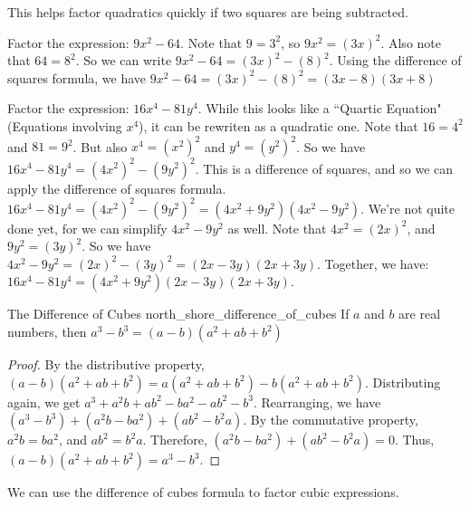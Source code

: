 \documentclass[crop=false,class=article,oneside]{standalone}
\begin{document}
        \begin{remark}
            This helps factor quadratics quickly if two
            squares are being subtracted.
        \end{remark}
        \begin{frameexample}{}{}
            Factor the expression: $9x^{2}-64$.
            Note that $9=3^{2}$, so $9x^{2}=(3x)^{2}$.
            Also note that $64=8^{2}$. So we can write
            $9x^{2}-64=(3x)^{2}-(8)^{2}$.
            Using the difference of squares formula,
            we have $9x^{2}-64=(3x)^{2}-(8)^{2}=(3x-8)(3x+8)$
        \end{frameexample}
        \begin{frameexample}{}{}
        Factor the expression: $16x^{4}-81y^{4}$. While this looks like a ``Quartic Equation" (Equations involving $x^4$), it can be rewriten as a quadratic one. Note that $16=4^{2}$ and $81=9^{2}$. But also $x^{4}=(x^{2})^{2}$ and $y^{4}=(y^{2})^{2}$. So we have $16x^{4}-81y^{4}=(4x^{2})^{2}-(9y^{2})^{2}$. This is a difference of squares, and so we can apply the difference of squares formula. $16x^{4}-81y^{4}=(4x^{2})^{2}-(9y^{2})^{2}=(4x^{2}+9y^{2})(4x^{2}-9y^{2})$. We're not quite done yet, for we can simplify $4x^{2}-9y^{2}$ as well. Note that $4x^{2}=(2x)^{2}$, and $9y^{2}=(3y)^{2}$. So we have $4x^{2}-9y^{2}=(2x)^{2}-(3y)^{2}=(2x-3y)(2x+3y)$. Together, we have: $16x^{4}-81y^{4}=(4x^{2}+9y^{2})(2x-3y)(2x+3y)$.
        \end{frameexample}
        \begin{frametheorem}{The Difference of Cubes}
                       {north_shore_difference_of_cubes}
            If $a$ and $b$ are real numbers,
            then $a^{3}-b^{3}=(a-b)(a^{2}+ab+b^{2})$
        \end{frametheorem}
        \begin{proof}
        By the distributive property, $(a-b)(a^{2}+ab+b^{2})=a(a^{2}+ab+b^{2})-b(a^{2}+ab+b^{2})$.
        Distributing again, we get $a^{3}+a^{2}b+ab^{2}-ba^{2}-ab^{2}-b^{3}$.
        Rearranging, we have $(a^{3}-b^{3})+(a^{2}b-ba^{2})+(ab^{2}-b^{2}a)$.
        By the commutative property, $a^{2}b=ba^{2}$, and $ab^{2}=b^{2}a$.
        Therefore, $(a^{2}b-ba^{2})+(ab^{2}-b^{2}a)=0$.
        Thus, $(a-b)(a^{2}+ab+b^{2})=a^{3}-b^{3}$.
        \end{proof}
        \begin{remark}
        We can use the difference of cubes formula to factor cubic expressions.
        \end{remark}
\end{document}
